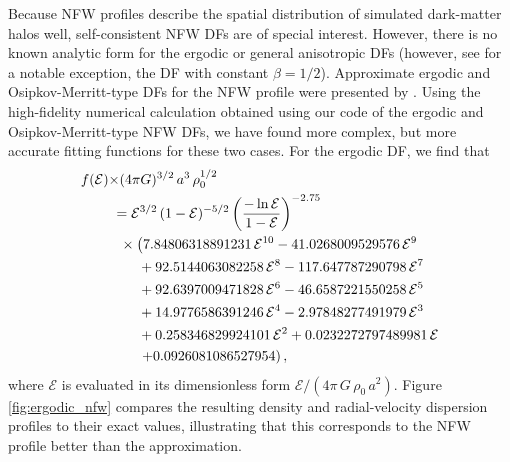 Because NFW profiles describe the spatial distribution of simulated dark-matter halos well, self-consistent NFW DFs are of special interest. However, there is no known analytic form for the ergodic or general anisotropic DFs (however, see \citealt{Evans06a} for a notable exception, the DF with constant $\beta = 1/2$). Approximate ergodic and Osipkov-Merritt-type DFs for the NFW profile were presented by \citet{Widrow00a}. Using the high-fidelity numerical calculation obtained using our code of the ergodic and Osipkov-Merritt-type NFW DFs, we have found more complex, but more accurate fitting functions for these two cases. For the ergodic DF, we find that
\begin{equation}
\begin{split}\label{eq-nfw-ergodic-newform}
    f(\mathcal{E})\times&(4\pi G)^{3/2}\,a^3\,\rho_0^{1/2} \\&\!\!\!= \mathcal{E}^{3/2} \,(1-\mathcal{E})^{-5/2}\left({-\ln \mathcal{E} \over 1-\mathcal{E}}\right)^{-2.75}\\& \times \left(7.84806318891231\, \mathcal{E}^{10} - 41.0268009529576\, \mathcal{E}^{9}\right.\\& \quad\ + 92.5144063082258\, \mathcal{E}^{8} - 117.647787290798\, \mathcal{E}^{7}\\&\quad\ + 92.6397009471828\, \mathcal{E}^{6} - 46.6587221550258\, \mathcal{E}^{5}\\&\quad\ + 14.9776586391246\, \mathcal{E}^{4} - 2.97848277491979\, \mathcal{E}^{3}\\&\quad\ + 0.258346829924101\, \mathcal{E}^{2} + 0.0232272797489981\, \mathcal{E}\\&\left. \quad\ + 0.0926081086527954\right),
\end{split}
\end{equation}
where $\mathcal{E}$ is evaluated in its dimensionless form $\mathcal{E}/(4\pi\,G\,\rho_0\,a^2)$.
Figure \ref{fig:ergodic_nfw} compares the resulting density and radial-velocity dispersion profiles to their exact values, illustrating that this corresponds to the NFW profile better than the \citet{Widrow00a} approximation.

